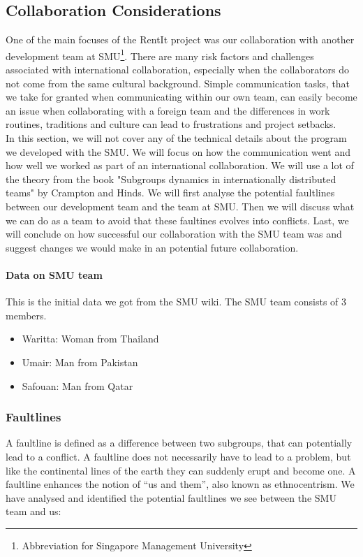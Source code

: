 \documentclass[a4paper,11pt,report]{article}
\begin{document}
\subsection{Collaboration Considerations}
One of the main focuses of the RentIt project was our collaboration with another development team at SMU\footnote{Abbreviation for Singapore Management University}. There are many risk factors and challenges associated with international collaboration, especially when the collaborators do not come from the same cultural background. Simple communication tasks, that we take for granted when communicating within our own team, can easily become an issue when collaborating with a foreign team and the differences in work routines, traditions and culture can lead to frustrations and project setbacks. \\

In this section, we will not cover any of the technical details about the program we developed with the SMU. We will focus on how the communication went and how well we worked as part of an international collaboration. We will use a lot of the theory from the book "Subgroups dynamics in internationally distributed teams" by Crampton and Hinds. We will first analyse the potential faultlines\cite{smu} between our development team and the team at SMU. Then we will discuss what we can do as a team to avoid that these faultines evolves into conflicts. Last, we will conclude on how successful our collaboration with the SMU team was and suggest changes we would make in an potential future collaboration.\\

\paragraph{Data on SMU team}

This is the initial data we got from the SMU wiki. The SMU team consists of 3 members.\\

\begin{itemize}
\item Waritta: Woman from Thailand
\item Umair: Man from Pakistan
\item Safouan: Man from Qatar
\end{itemize}

\subsubsection{Faultlines}
A faultline is defined as a difference between two subgroups, that can potentially lead to a conflict. A faultline does not necessarily have to lead to a problem, but like the continental lines of the earth they can suddenly erupt and become one. A faultline enhances the notion of “us and them”, also known as ethnocentrism\cite{smu}. We have analysed and identified the potential faultlines we see between the SMU team and us:
\end{document}
